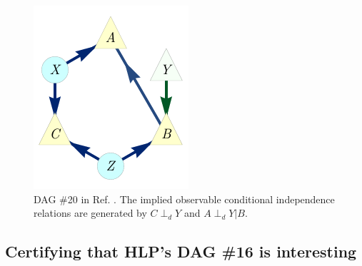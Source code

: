 \documentclass[aps,english,10pt,superscriptaddress,onecolumn,twoside,longbibliography,pra,floatfix,fleqn,nofootinbib]{revtex4-1}%
\newcommand*{\tred}[1]{{\color{carmine}{\textbf{#1}}}}
\theoremstyle{definition}
\newcounter{example}[section]
\newenvironment{example}[1][]{\refstepcounter{example}\par\medskip
   \noindent \textbf{Example~\theexample}\hspace{1em}\rmfamily#1}{\par\medskip\par}
\renewcommand{\theexample}{\arabic{example}}
\newcommand{\aindep}{\ensuremath{\perp_d}} %
\begin{document}
\begin{figure}[t]
\begin{minipage}[t]{0.3\linewidth}
\centering
\includegraphics[scale=1]{scen20DAG.pdf}
\caption{DAG \#20 in Ref. \cite{pusey2014gdag}. The implied observable conditional independence relations are generated by $C\aindep Y$ and $A \aindep Y|B$.}\label{fig:GDAG20}
\end{minipage}
\hfill
\end{figure}

\color{blue}

\subsection{Certifying that HLP's DAG \#16 is interesting} 
\label{example:Pienaar}

\end{document}
